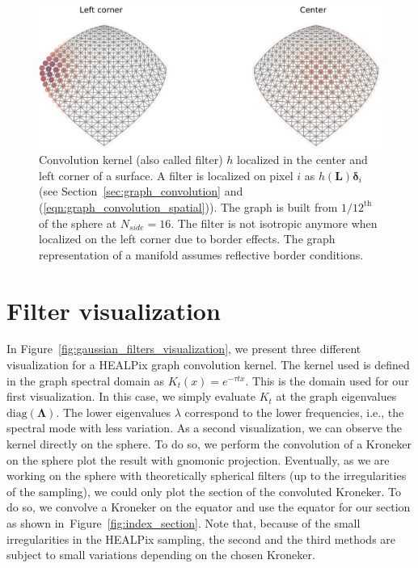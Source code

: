 \documentclass[final,twocolumn,3p,times,authoryear]{elsarticle}
\newcommand{\figref}[1]{Figure~\ref{fig:#1}}
\newcommand{\secref}[1]{Section~\ref{sec:#1}}
\newcommand{\eqnref}[1]{(\ref{eqn:#1})}
\renewcommand{\b}[1]{{\bm{#1}}}   %
\newcommand{\1}{\b{1}}              %
\newcommand{\0}{\b{0}}              %
\renewcommand{\L}{\b{L}}
\newcommand{\bLambda}{\b{\Lambda}}
\begin{document}
\begin{figure}[!ht]
	\centering
	\includegraphics[width=\linewidth]{border_effects}
	\caption{Convolution kernel (also called filter) $h$ localized in the center and left corner of a surface. A filter is localized on pixel $i$ as $h(\L) \b \delta_i$ (see \secref{graph_convolution} and \eqnref{graph_convolution_spatial}). The graph is built from $1/12^\text{th}$ of the sphere at $N_{side} = 16$. The filter is not isotropic anymore when localized on the left corner due to border effects. The graph representation of a manifold assumes reflective border conditions.}
	\label{fig:border_effects}
\end{figure}

\section{Filter visualization}
\label{sec:filter_visualization}

In \figref{gaussian_filters_visualization}, we present three different
visualization for a HEALPix graph convolution kernel. The kernel used is defined in the graph spectral domain as $K_t(x)=e^{-\tau t x}$. This is the domain used for our first visualization. In this case, we simply evaluate $K_t$
at the graph eigenvalues $\text{diag}(\bLambda)$. The lower eigenvalues $\lambda$ correspond to the lower frequencies, i.e., the spectral mode with less variation.
As a second visualization, we can observe the kernel directly on the sphere. To do so, we perform the convolution of a
Kroneker on the sphere plot the result with gnomonic projection. Eventually, as we are
working on the sphere with theoretically spherical filters (up to the irregularities of the sampling), we could only plot the section of the convoluted Kroneker. To do so, we convolve a Kroneker on the equator and use the equator for our section as shown in~\figref{index_section}. Note that, because of the small irregularities in the HEALPix
sampling, the second and the third methods are subject to small variations depending on the
chosen Kroneker.
\end{document}
